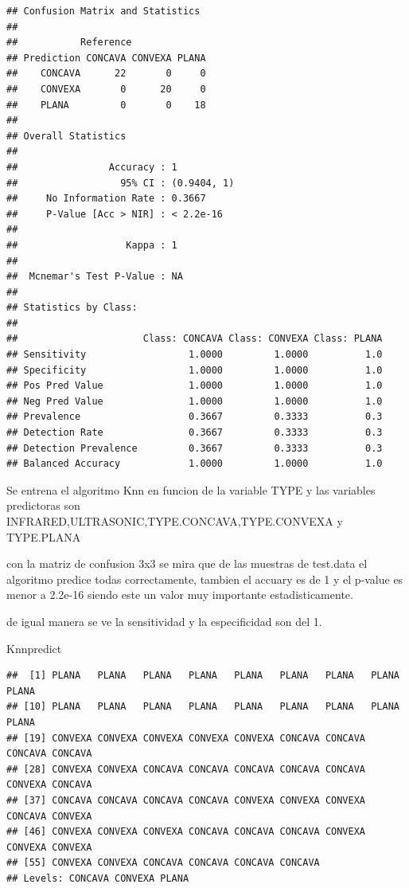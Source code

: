 \documentclass[
]{article}
\newenvironment{Shaded}{\begin{snugshade}}{\end{snugshade}}
\newcommand{\NormalTok}[1]{#1}
\begin{document}
\begin{verbatim}
## Confusion Matrix and Statistics
## 
##           Reference
## Prediction CONCAVA CONVEXA PLANA
##    CONCAVA      22       0     0
##    CONVEXA       0      20     0
##    PLANA         0       0    18
## 
## Overall Statistics
##                                      
##                Accuracy : 1          
##                  95% CI : (0.9404, 1)
##     No Information Rate : 0.3667     
##     P-Value [Acc > NIR] : < 2.2e-16  
##                                      
##                   Kappa : 1          
##                                      
##  Mcnemar's Test P-Value : NA         
## 
## Statistics by Class:
## 
##                      Class: CONCAVA Class: CONVEXA Class: PLANA
## Sensitivity                  1.0000         1.0000          1.0
## Specificity                  1.0000         1.0000          1.0
## Pos Pred Value               1.0000         1.0000          1.0
## Neg Pred Value               1.0000         1.0000          1.0
## Prevalence                   0.3667         0.3333          0.3
## Detection Rate               0.3667         0.3333          0.3
## Detection Prevalence         0.3667         0.3333          0.3
## Balanced Accuracy            1.0000         1.0000          1.0
\end{verbatim}

Se entrena el algoritmo Knn en funcion de la variable TYPE y las
variables predictoras son INFRARED,ULTRASONIC,TYPE.CONCAVA,TYPE.CONVEXA
y TYPE.PLANA

con la matriz de confusion 3x3 se mira que de las muestras de test.data
el algoritmo predice todas correctamente, tambien el accuary es de 1 y
el p-value es menor a 2.2e-16 siendo este un valor muy importante
estadisticamente.

de igual manera se ve la sensitividad y la especificidad son del 1.

\begin{Shaded}
\begin{Highlighting}[]
\NormalTok{Knnpredict}
\end{Highlighting}
\end{Shaded}

\begin{verbatim}
##  [1] PLANA   PLANA   PLANA   PLANA   PLANA   PLANA   PLANA   PLANA   PLANA  
## [10] PLANA   PLANA   PLANA   PLANA   PLANA   PLANA   PLANA   PLANA   PLANA  
## [19] CONVEXA CONVEXA CONVEXA CONVEXA CONVEXA CONCAVA CONCAVA CONCAVA CONCAVA
## [28] CONVEXA CONVEXA CONCAVA CONCAVA CONCAVA CONCAVA CONCAVA CONVEXA CONCAVA
## [37] CONCAVA CONCAVA CONCAVA CONCAVA CONVEXA CONVEXA CONVEXA CONCAVA CONVEXA
## [46] CONVEXA CONVEXA CONVEXA CONCAVA CONCAVA CONCAVA CONVEXA CONVEXA CONVEXA
## [55] CONVEXA CONVEXA CONCAVA CONCAVA CONCAVA CONCAVA
## Levels: CONCAVA CONVEXA PLANA
\end{verbatim}
\end{document}
